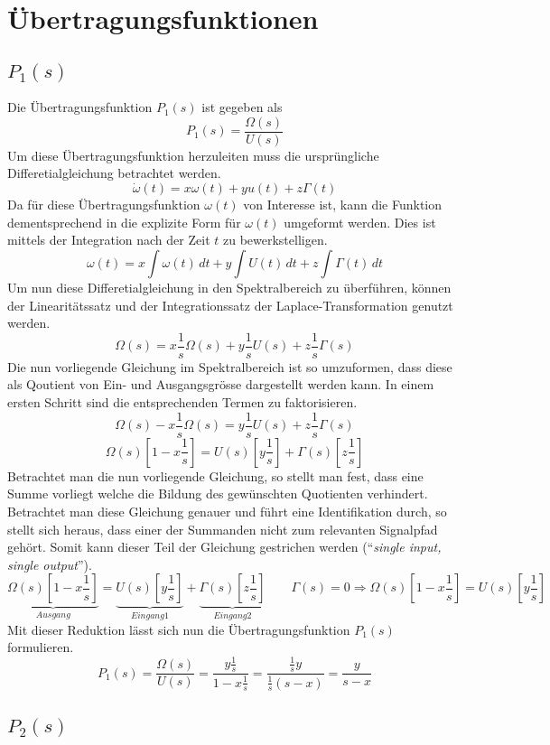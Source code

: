 \section{Übertragungsfunktionen}

\subsection{$P_1(s)$}
Die Übertragungsfunktion $P_1(s)$ ist gegeben als
\[
	P_1(s) = \frac{\Omega(s)}{U(s)}
\]
Um diese Übertragungsfunktion herzuleiten muss die ursprüngliche
Differetialgleichung betrachtet werden.
\[
	\dot\omega(t) = x \omega(t) + y u(t) + z \Gamma(t)
\]
Da für diese Übertragungsfunktion $\omega(t)$ von Interesse ist, kann die
Funktion dementsprechend in die explizite Form für $\omega(t)$ umgeformt
werden. Dies ist mittels der Integration nach der Zeit $t$ zu bewerkstelligen.
\[
	\omega(t) =
		x \int\omega(t)\,dt
		+ y \int U(t)\,dt 
		+ z \int\Gamma(t)\,dt
\]
Um nun diese Differetialgleichung in den Spektralbereich zu überführen,
können der Linearitätssatz und der Integrationssatz der Laplace-Transformation
genutzt werden.
\[
	\Omega(s) =
		x \frac{1}{s} \Omega(s) 
		+ y \frac{1}{s} U(s)
		+ z \frac{1}{s} \Gamma(s) 
\]
Die nun vorliegende Gleichung im Spektralbereich ist so umzuformen, dass diese
als Qoutient von Ein- und Ausgangsgrösse dargestellt werden kann. In einem
ersten Schritt sind die entsprechenden Termen zu faktorisieren.
\[
	\Omega(s) - x \frac{1}{s} \Omega(s) =
		y \frac{1}{s} U(s) + z \frac{1}{s} \Gamma(s)
\]
\[
	\Omega(s) \left[ 1 - x \frac{1}{s} \right] =
		U(s) \left[ y \frac{1}{s} \right]
		+ \Gamma(s) \left[ z \frac{1}{s}\right]
\]
Betrachtet man die nun vorliegende Gleichung, so stellt man fest, dass eine
Summe vorliegt welche die Bildung des gewünschten Quotienten verhindert.
Betrachtet man diese Gleichung genauer und führt eine Identifikation durch, so
stellt sich heraus, dass einer der Summanden nicht zum relevanten Signalpfad
gehört. Somit kann dieser Teil der Gleichung gestrichen werden
(``\emph{single input, single output}'').
\[
	\underbrace{\Omega(s) \left[ 1 - x \frac{1}{s} \right]}_{Ausgang} =
		\underbrace{U(s) \left[ y \frac{1}{s} \right]}_{Eingang 1}
		+ \underbrace{\Gamma(s) \left[ z \frac{1}{s}\right]}_{Eingang 2}
	\qquad \Gamma(s) = 0 \Rightarrow
		\Omega(s) \left[ 1 - x \frac{1}{s} \right] =
		U(s) \left[ y \frac{1}{s} \right]
\]
Mit dieser Reduktion lässt sich nun die Übertragungsfunktion $P_1(s)$
formulieren.
\[
	P_1(s) = \frac{\Omega(s)}{U(s)} =
		\frac{y \frac{1}{s}}{1 - x \frac{1}{s}} = 
		\frac{\frac{1}{s} y}{\frac{1}{s} (s-x)} =
		\frac{y}{s-x}
\]


\subsection{$P_2(s)$}
